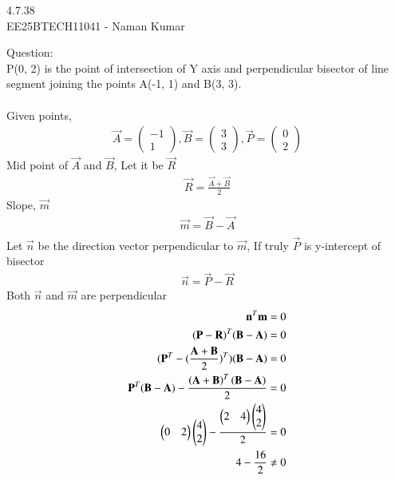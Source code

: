\documentclass[journal]{IEEEtran}
\author{EE25BTECH11041-Naman Kumar }
\begin{document}
\begin{center}
    \huge{4.7.38}\\
    \large{EE25BTECH11041 - Naman Kumar}
\end{center}
Question:\\
P(0, 2) is the point of intersection of Y axis and perpendicular bisector of line segment joining the points A(-1, 1) and B(3, 3).\\
\solution \\
Given points,
\begin{align}
\Vec{A}=\begin{pmatrix} -1\\1 \end{pmatrix},\Vec{B}=\begin{pmatrix} 3\\3 \end{pmatrix},\Vec{P}=\begin{pmatrix} 0\\2 \end{pmatrix}
\end{align}
Mid point of $\Vec{A}$ and $\Vec{B}$, Let it be $\Vec{R}$
\begin{align}
    \Vec{R}=\frac{\vec{A}+\vec{B}}{2}
\end{align}
Slope, $\vec{m}$
\begin{align}
    \vec{m}=\vec{B}-\vec{A}\\
\end{align}
Let $\vec{n}$ be the direction vector perpendicular to $\vec{m}$, If truly $\vec{P}$ is y-intercept of bisector 
\begin{align}
\vec{n}=\vec{P}-\vec{R}
\end{align}
Both $\vec{n}$ and $\vec{m}$ are perpendicular
\begin{align}
    \mathbf{n}^T\mathbf{m}=0\\
    (\mathbf{P}-\mathbf{R})^T(\mathbf{B}-\mathbf{A})=0\\
    (\mathbf{P}^T-(\frac{\mathbf{A}+\mathbf{B}}{2})^T)(\mathbf{B}-\mathbf{A})=0\\
    \mathbf{P}^T(\mathbf{B}-\mathbf{A})-\frac{\left(\mathbf{A}+\mathbf{B}\right)^T\left(\mathbf{B}-\mathbf{A}\right)}{2}=0\\
    \begin{pmatrix} 0&2 \end{pmatrix}\begin{pmatrix} 4\\2 \end{pmatrix}-\frac{\begin{pmatrix} 2&4 \end{pmatrix}\begin{pmatrix} 4\\2 \end{pmatrix}}{2}=0\\
    4-\frac{16}{2}\neq0
\end{align}
\end{document}
